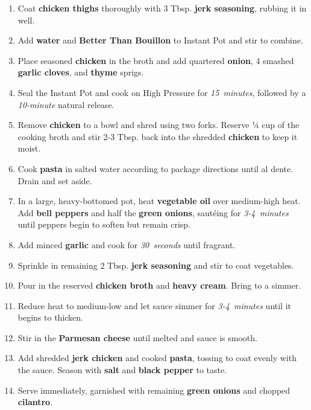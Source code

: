 \documentclass[11pt,letterpaper]{article}
\begin{document}
\begin{enumerate}
    \item Coat \textbf{chicken thighs} thoroughly with 3 Tbsp. \textbf{jerk seasoning}, rubbing it in well.
    
    \item Add \textbf{water} and \textbf{Better Than Bouillon} to Instant Pot and stir to combine.
    
    \item Place seasoned \textbf{chicken} in the broth and add quartered \textbf{onion}, 4 smashed \textbf{garlic cloves}, and \textbf{thyme} sprigs.
    
    \item Seal the Instant Pot and cook on High Pressure for \textit{15~minutes}, followed by a \textit{10-minute} natural release.
    
    \item Remove \textbf{chicken} to a bowl and shred using two forks. Reserve ¼ cup of the cooking broth and stir 2-3 Tbsp. back into the shredded \textbf{chicken} to keep it moist.
    
    \item Cook \textbf{pasta} in salted water according to package directions until al dente. Drain and set aside.
    
    \item In a large, heavy-bottomed pot, heat \textbf{vegetable oil} over medium-high heat. Add \textbf{bell peppers} and half the \textbf{green onions}, sautéing for \textit{3-4~minutes} until peppers begin to soften but remain crisp.
    
    \item Add minced \textbf{garlic} and cook for \textit{30~seconds} until fragrant.
    
    \item Sprinkle in remaining 2 Tbsp. \textbf{jerk seasoning} and stir to coat vegetables.
    
    \item Pour in the reserved \textbf{chicken broth} and \textbf{heavy cream}. Bring to a simmer.
    
    \item Reduce heat to medium-low and let sauce simmer for \textit{3-4~minutes} until it begins to thicken.
    
    \item Stir in the \textbf{Parmesan cheese} until melted and sauce is smooth.
    
    \item Add shredded \textbf{jerk chicken} and cooked \textbf{pasta}, tossing to coat evenly with the sauce. Season with \textbf{salt} and \textbf{black pepper} to taste.
    
    \item Serve immediately, garnished with remaining \textbf{green onions} and chopped \textbf{cilantro}.
\end{enumerate}
\end{document}
